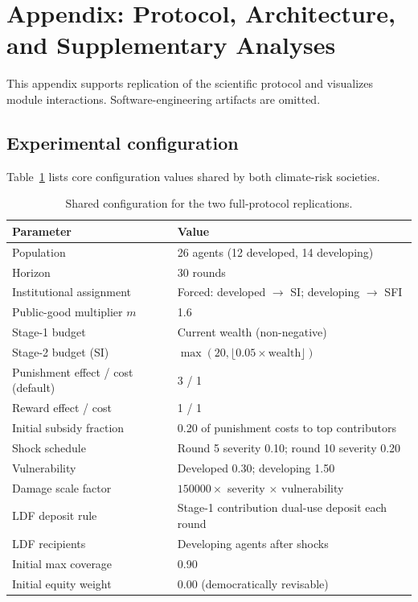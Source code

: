 \section{Appendix: Protocol, Architecture, and Supplementary Analyses}
\label{app:main}

This appendix supports replication of the scientific protocol and visualizes module interactions.
Software-engineering artifacts are omitted.

\subsection{Experimental configuration}

Table~\ref{tab:app_config} lists core configuration values shared by both climate-risk societies.

\begin{table}[h]
\centering
\caption{Shared configuration for the two full-protocol replications.}
\label{tab:app_config}
\small
\begin{tabular}{@{}lp{}@{}}
\toprule
Parameter & Value \\
\midrule
Population & 26 agents (12 developed, 14 developing) \\
Horizon & 30 rounds \\
Institutional assignment & Forced: developed $\to$ SI; developing $\to$ SFI \\
Public-good multiplier $m$ & 1.6 \\
Stage-1 budget & Current wealth (non-negative) \\
Stage-2 budget (SI) & $\max(20,\lfloor 0.05\times\mathrm{wealth}\rfloor)$ \\
Punishment effect / cost (default) & 3 / 1 \\
Reward effect / cost & 1 / 1 \\
Initial subsidy fraction & 0.20 of punishment costs to top contributors \\
Shock schedule & Round 5 severity 0.10; round 10 severity 0.20 \\
Vulnerability & Developed 0.30; developing 1.50 \\
Damage scale factor & $150000 \times$ severity $\times$ vulnerability \\
LDF deposit rule & Stage-1 contribution dual-use deposit each round \\
LDF recipients & Developing agents after shocks \\
Initial max coverage & 0.90 \\
Initial equity weight & 0.00 (democratically revisable) \\

\end{tabular}
\end{table}
